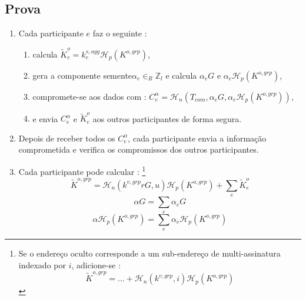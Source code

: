 

\subsection*{Prova}

\begin{enumerate}
    \item Cada participante $e$ faz o seguinte :
    \begin{enumerate}
        \item calcula $\tilde{K}^{o}_{e} = k^{s,agg}_e \mathcal{H}_p(K^{o,grp})$,
        \item gera a componente semente$\alpha_e \in_R \mathbb{Z}_l$ e calcula $\alpha_e G$ e $\alpha_e \mathcal{H}_p(K^{o,grp})$,
        \item compromete-se aos dados com : $C^{\alpha}_{e} = \mathcal{H}_n(T_{com}, \alpha_e G, \alpha_e \mathcal{H}_p(K^{o,grp}))$,
        \item e envia $C^{\alpha}_{e}$ e $\tilde{K}^{o}_{e}$ aos outros participantes de forma segura.
    \end{enumerate}
    \item Depois de receber todos os $C^{\alpha}_{e}$, cada participante envia a informação comprometida e verifica os compromissos dos outros participantes.   
    \item Cada participante pode calcular : 
\footnote{Se o endereço oculto corresponde a um sub-endereço de multi-assinatura indexado por $i$, adicione-se : 
    \[\tilde{K}^{o,grp} = ... + \mathcal{H}_n(k^{v,grp},i) \mathcal{H}_p(K^{o,grp})\]}
    \[\tilde{K}^{o,grp} = \mathcal{H}_n(k^{v,grp} r G, u) \mathcal{H}_p(K^{o,grp}) + \sum_e \tilde{K}^{o}_{e}\]
    \[\alpha G = \sum_e \alpha_{e} G\]
    \[\alpha \mathcal{H}_p(K^{o,grp}) = \sum_e \alpha_{e} \mathcal{H}_p(K^{o,grp})\]

\end{enumerate}
